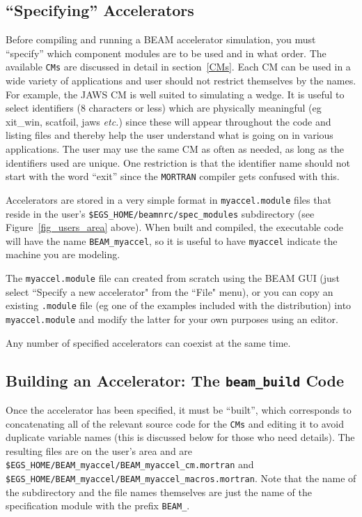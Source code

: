 \documentclass[12pt,twoside]{article}
\newcommand{\etc}{{\em etc.}}
\begin{document}
\subsection{``Specifying'' Accelerators}

Before compiling and running a BEAM accelerator simulation, you must
``specify'' which component modules are to be used and in what order.
The available
\verb+CMs+ are discussed in detail in section~\ref{CMs}.  Each CM can be
used in a wide variety of applications and user should not restrict
themselves by the names. For example, the JAWS CM is well suited to
simulating a wedge.  It is useful to select identifiers (8 characters or
less) which are physically meaningful (eg xit\_win, scatfoil, jaws \etc)
since these will appear throughout the code and listing files and thereby
help the user understand
what is going on in various applications.  The user may use the same CM
as often as needed, as long as the identifiers used are unique.
One restriction is that the identifier name should not start with the
word ``exit'' since the \verb+MORTRAN+ compiler gets confused with this.

Accelerators are stored in a very simple format in
{\tt myaccel.module} files that reside in the
user's {\tt \$EGS\_HOME/beamnrc/spec\_modules} subdirectory (see
Figure~\ref{fig_users_area} above).  When built and compiled, the
executable code will have the name {\tt BEAM\_myaccel}, so
it is useful to have {\tt myaccel} indicate the machine you are
modeling.

The {\tt myaccel.module} file can created from scratch using the
BEAM GUI (just select ``Specify a new accelerator" from the ``File"
menu), or you can copy an existing {\tt .module} file (eg one of the
examples included with the distribution) into {\tt myaccel.module}
and modify the latter for your own purposes using an editor.

Any number of specified accelerators can coexist at the same
time.

\subsection{Building an Accelerator: The {\tt beam\_build} Code}
\label{beambuildsect}

Once the accelerator has been specified, it must be ``built'', which
corresponds to concatenating all of the relevant source code for the
\verb+CMs+
and editing it to avoid duplicate variable names
(this is discussed below for
those who need details).  The resulting files are on the user's area and
are
\verb+$EGS_HOME/BEAM_myaccel/BEAM_myaccel_cm.mortran+ and \\
\verb+$EGS_HOME/BEAM_myaccel/BEAM_myaccel_macros.mortran+.
Note that the name of the subdirectory and the file names themselves
 
are just the name of the specification module with the prefix \verb+BEAM_+.
\end{document}
